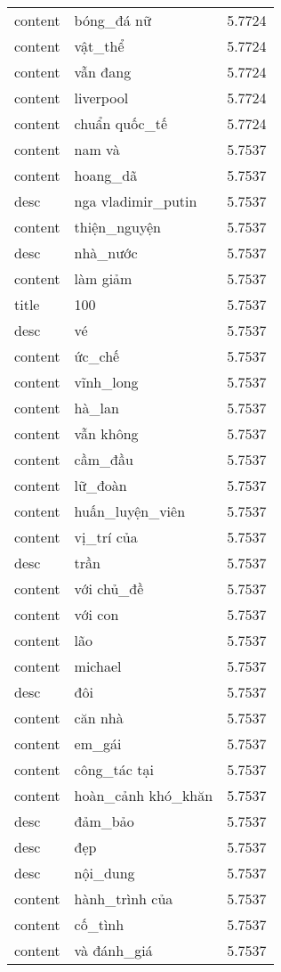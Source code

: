 \documentclass{article}
\begin{document}
\begin{tabular}{lll}
content & bóng\_đá nữ & 5.7724\\
content & vật\_thể & 5.7724\\
content & vẫn đang & 5.7724\\
content & liverpool & 5.7724\\
content & chuẩn quốc\_tế & 5.7724\\
content & nam và & 5.7537\\
content & hoang\_dã & 5.7537\\
desc & nga vladimir\_putin & 5.7537\\
content & thiện\_nguyện & 5.7537\\
desc & nhà\_nước & 5.7537\\
content & làm giảm & 5.7537\\
title & 100 & 5.7537\\
desc & vé & 5.7537\\
content & ức\_chế & 5.7537\\
content & vĩnh\_long & 5.7537\\
content & hà\_lan & 5.7537\\
content & vẫn không & 5.7537\\
content & cầm\_đầu & 5.7537\\
content & lữ\_đoàn & 5.7537\\
content & huấn\_luyện\_viên & 5.7537\\
content & vị\_trí của & 5.7537\\
desc & trần & 5.7537\\
content & với chủ\_đề & 5.7537\\
content & với con & 5.7537\\
content & lão & 5.7537\\
content & michael & 5.7537\\
desc & đôi & 5.7537\\
content & căn nhà & 5.7537\\
content & em\_gái & 5.7537\\
content & công\_tác tại & 5.7537\\
content & hoàn\_cảnh khó\_khăn & 5.7537\\
desc & đảm\_bảo & 5.7537\\
desc & đẹp & 5.7537\\
desc & nội\_dung & 5.7537\\
content & hành\_trình của & 5.7537\\
content & cố\_tình & 5.7537\\
content & và đánh\_giá & 5.7537\\

\end{tabular}
\end{document}
